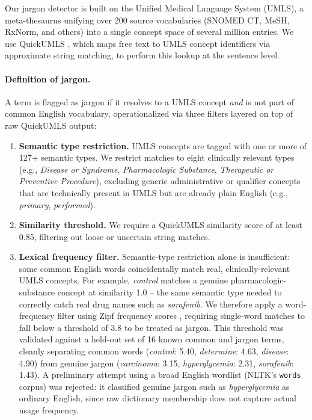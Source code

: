 \documentclass[11pt]{article}
\begin{document}
Our jargon detector is built on the Unified Medical Language System (UMLS), a
meta-thesaurus unifying over 200 source vocabularies (SNOMED CT, MeSH, RxNorm,
and others) into a single concept space of several million entries. We use
QuickUMLS \citep{Soldaini2016}, which maps free text to UMLS concept identifiers
via approximate string matching, to perform this lookup at the sentence level.

\paragraph{Definition of jargon.} A term is flagged as jargon if it resolves to a
UMLS concept \emph{and} is not part of common English vocabulary, operationalized
via three filters layered on top of raw QuickUMLS output:

\begin{enumerate}
    \item \textbf{Semantic type restriction.} UMLS concepts are tagged with one
    or more of 127+ semantic types. We restrict matches to eight clinically
    relevant types (e.g., \textit{Disease or Syndrome}, \textit{Pharmacologic
    Substance}, \textit{Therapeutic or Preventive Procedure}), excluding generic
    administrative or qualifier concepts that are technically present in UMLS
    but are already plain English (e.g., \textit{primary}, \textit{performed}).
    \item \textbf{Similarity threshold.} We require a QuickUMLS similarity score
    of at least 0.85, filtering out loose or uncertain string matches.
    \item \textbf{Lexical frequency filter.} Semantic-type restriction alone is
    insufficient: some common English words coincidentally match real,
    clinically-relevant UMLS concepts. For example, \emph{control} matches a
    genuine pharmacologic-substance concept at similarity 1.0 -- the same
    semantic type needed to correctly catch real drug names such as
    \emph{sorafenib}. We therefore apply a word-frequency filter using Zipf
    frequency scores \citep{wordfreq}, requiring single-word matches to fall
    below a threshold of 3.8 to be treated as jargon. This threshold was
    validated against a held-out set of 16 known common and jargon terms,
    cleanly separating common words (\emph{control}: 5.40, \emph{determine}:
    4.63, \emph{disease}: 4.90) from genuine jargon (\emph{carcinoma}: 3.15,
    \emph{hyperglycemia}: 2.31, \emph{sorafenib}: 1.43). A preliminary attempt
    using a broad English wordlist (NLTK's \texttt{words} corpus) was rejected:
    it classified genuine jargon such as \emph{hyperglycemia} as ordinary
    English, since raw dictionary membership does not capture actual usage
    frequency.
\end{enumerate}
\end{document}
